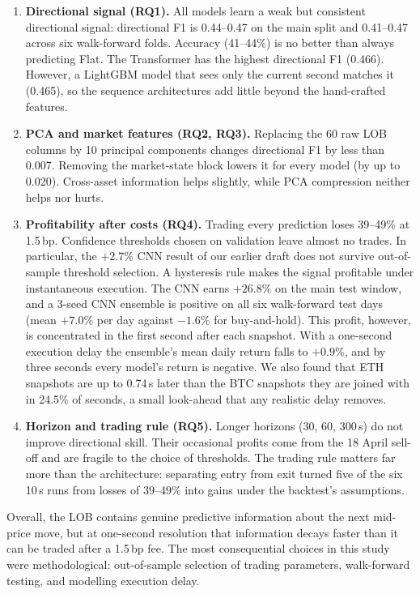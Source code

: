 \begin{enumerate}
  \item \textbf{Directional signal (RQ1).} All models learn a weak but consistent
  directional signal: directional F1 is 0.44--0.47 on the main split and 0.41--0.47 across
  six walk-forward folds. Accuracy (41--44\%) is no better than always predicting Flat.
  The Transformer has the highest directional F1 (0.466). However, a LightGBM model
  that sees only the current second matches it (0.465), so the sequence architectures add
  little beyond the hand-crafted features.
  \item \textbf{PCA and market features (RQ2, RQ3).} Replacing the 60 raw LOB columns by
  10 principal components changes directional F1 by less than 0.007. Removing the
  market-state block lowers it for every model (by up to 0.020). Cross-asset information
  helps slightly, while PCA compression neither helps nor hurts.
  \item \textbf{Profitability after costs (RQ4).} Trading every prediction loses 39--49\%
  at 1.5\,bp. Confidence thresholds chosen on validation leave almost no trades. In
  particular, the $+2.7\%$ CNN result of our earlier draft does not survive out-of-sample
  threshold selection. A hysteresis rule makes the signal profitable under instantaneous
  execution. The CNN earns $+26.8\%$ on the main test window, and a 3-seed CNN ensemble is
  positive on all six walk-forward test days (mean $+7.0\%$ per day against $-1.6\%$ for
  buy-and-hold). This profit, however, is concentrated in the first second after each
  snapshot. With a one-second execution delay the ensemble's mean daily return falls to
  $+0.9\%$, and by three seconds every model's return is negative. We also found that ETH
  snapshots are up to 0.74\,s later than the BTC snapshots they are joined with in 24.5\%
  of seconds, a small look-ahead that any realistic delay removes.
  \item \textbf{Horizon and trading rule (RQ5).} Longer horizons (30, 60, 300\,s) do not
  improve directional skill. Their occasional profits come from the 18 April sell-off and
  are fragile to the choice of thresholds. The trading rule matters far more than the
  architecture: separating entry from exit turned five of the six 10\,s runs from
  losses of 39--49\% into gains under the backtest's assumptions.
\end{enumerate}

Overall, the LOB contains genuine predictive information about the next mid-price move,
but at one-second resolution that information decays faster than it can be traded after
a 1.5\,bp fee. The most consequential choices in this study were methodological:
out-of-sample selection of trading parameters, walk-forward testing, and modelling
execution delay.

